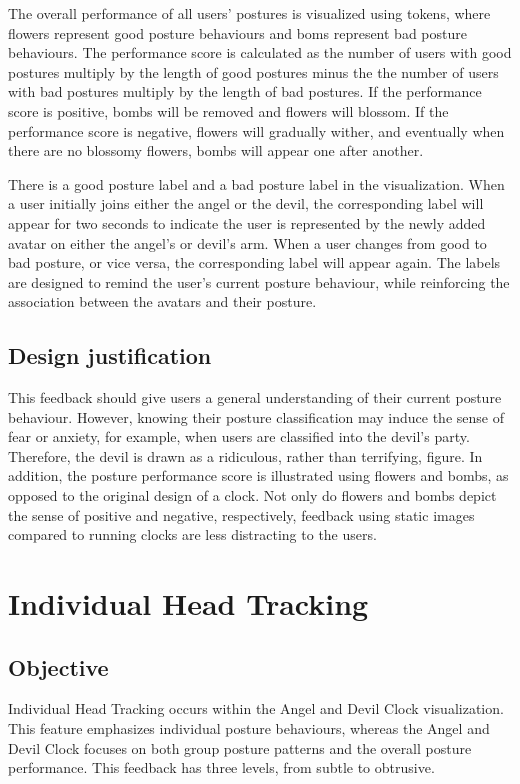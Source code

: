 The overall performance of all users' postures is visualized using tokens, where flowers represent good posture behaviours and boms represent bad posture behaviours. The performance score is calculated as the number of users with good postures multiply by the length of good postures minus the the number of users with bad postures multiply by the length of bad postures. If the performance score is positive, bombs will be removed and flowers will blossom. If the performance score is negative, flowers will gradually wither, and eventually when there are no blossomy flowers, bombs will appear one after another.

There is a good posture label and a bad posture label in the visualization. When a user initially joins either the angel or the devil, the corresponding label will appear for two seconds to indicate the user is represented by the newly added avatar on either the angel's or devil's arm. When a user changes from good to bad posture, or vice versa, the corresponding label will appear again. The labels are designed to remind the user's current posture behaviour, while reinforcing the association between the avatars and their posture.

\subsection{Design justification}
This feedback should give users a general understanding of their current posture behaviour. However, knowing their posture classification may induce the sense of fear or anxiety, for example, when users are classified into the devil's party. Therefore, the devil is drawn as a ridiculous, rather than terrifying, figure. In addition, the posture performance score is illustrated using flowers and bombs, as opposed to the original design of a clock. Not only do flowers and bombs depict the sense of positive and negative, respectively, feedback using static images compared to running clocks are less distracting to the users.

\section{Individual Head Tracking}
\subsection{Objective}
Individual Head Tracking occurs within the Angel and Devil Clock visualization. This feature emphasizes individual posture behaviours, whereas the Angel and Devil Clock focuses on both group posture patterns and the overall posture performance. This feedback has three levels, from subtle to obtrusive.

